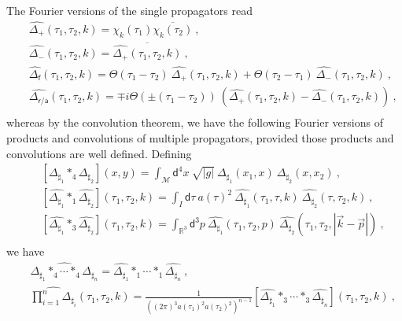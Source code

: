 \documentclass[11pt]{book}
\newcommand{\abs}[1]{\left|#1\right|}
\newcommand{\Mcal}{\mathcal{M}}
\newcommand{\asf}{\mathsf{a}}
\newcommand{\dsf}{\mathsf{d}}
\newcommand{\fsf}{\mathsf{f}}
\newcommand{\rsf}{\mathsf{r}}
\theoremstyle{break}
\begin{document}
The Fourier versions of the single propagators read
%
\begin{eqnarray}
&& \widehat{\Delta_+}(\tau_1,\tau_2,k) = \chi_k(\tau_1) \overline{\chi_k(\tau_2)} \ , \nonumber \\
&& \widehat{\Delta_-}(\tau_1,\tau_2,k) = \overline{\widehat{\Delta_+}(\tau_1,\tau_2,k)} \ , \nonumber \\
&& \widehat{\Delta_\fsf}(\tau_1,\tau_2,k) = \Theta(\tau_1-\tau_2) \ \widehat{\Delta_+}(\tau_1,\tau_2,k) + \Theta(\tau_2-\tau_1) \ \widehat{\Delta_-}(\tau_1,\tau_2,k) \ , \nonumber \\
&& \widehat{\Delta_{\rsf/\asf}}(\tau_1,\tau_2,k) = \mp i \Theta\left(\pm(\tau_1-\tau_2)\right) \ \left(\widehat{\Delta_+}(\tau_1,\tau_2,k) - \widehat{\Delta_-}(\tau_1,\tau_2,k)\right) \ , \nonumber \\
\label{eq:propagators_fourier_exp}
\end{eqnarray}
%
whereas by the convolution theorem, we have the following Fourier versions of products and convolutions of multiple propagators, provided those products and convolutions are well defined. Defining
%
\begin{eqnarray}
&& \left[\Delta_{\sharp_1}\ast_4\Delta_{\sharp_2}\right](x,y) = \int_\Mcal \dsf^4x \ \sqrt{\abs{g}} \ \Delta_{\sharp_1}(x_1,x) \ \Delta_{\sharp_2}(x,x_2) \ , \nonumber \\
%
&& \left[\widehat{\Delta_{\sharp_1}}\ast_1\widehat{\Delta_{\sharp_2}}\right](\tau_1,\tau_2,k) = \int_I \dsf\tau \ a(\tau)^2 \ \widehat{\Delta_{\sharp_1}}(\tau_1,\tau,k) \ \widehat{\Delta_{\sharp_2}}(\tau,\tau_2,k) \ , \nonumber \\
%
&& \left[\widehat{\Delta_{\sharp_1}}\ast_3\widehat{\Delta_{\sharp_2}}\right](\tau_1,\tau_2,k) = \int_{\mathbb{R}^3} \dsf^3p \ \widehat{\Delta_{\sharp_1}}(\tau_1,\tau_2,p) \ \widehat{\Delta_{\sharp_2}}\left(\tau_1,\tau_2,|\vec{k}-\vec{p}|\right) \ , \nonumber \\
\label{eq:def_convolutions}
\end{eqnarray}
%
we have
%
\begin{eqnarray}
&& \widehat{\Delta_{\sharp_1}\ast_4\cdots\ast_4\Delta_{\sharp_n}}=\widehat{\Delta_{\sharp_1}}\ast_1\cdots\ast_1 \widehat{\Delta_{\sharp_n}} \ , \nonumber \\
&& \widehat{\prod^n_{i=1}\Delta_{\sharp_i}}(\tau_1,\tau_2,k)=\frac{1}{\left((2\pi)^3 a(\tau_1)^{2}a(\tau_2)^{2}\right)^{n-1}}\left[\widehat{\Delta_{\sharp_1}}\ast_3\cdots\ast_3\widehat{\Delta_{\sharp_n}}\right](\tau_1,\tau_2,k) \ , \nonumber \\
\label{eq:convolution_identities}
\end{eqnarray}
\end{document}
